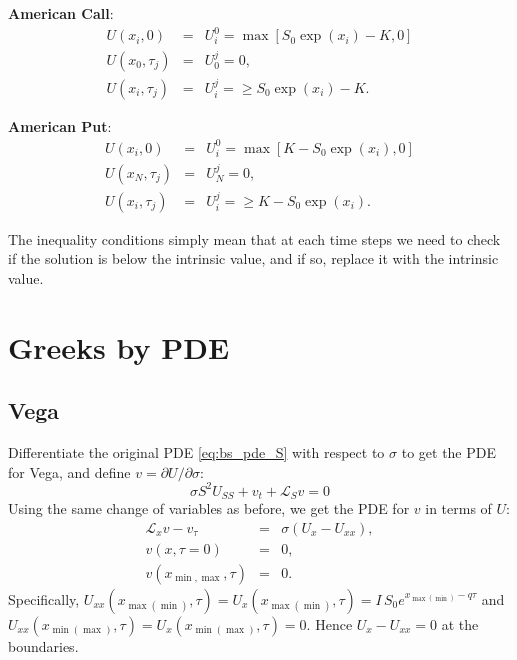 \documentclass[11pt, letterpaper]{article}
\begin{document}
        \textbf{American Call}:
        \begin{eqnarray}
            U(x_i, 0) &=& U_{i}^0 = \max \left[S_0 \exp(x_i) - K, 0\right]\nonumber\\
            U(x_0, \tau_j) & = & U_0^j= 0,\\
            U(x_i, \tau_j) & = & U_i^j = \ge S_0 \exp(x_i) - K.\nonumber
        \end{eqnarray}
        
        \textbf{American Put}:
        \begin{eqnarray}
            U(x_i, 0) &=& U_{i}^0 = \max \left[K - S_0 \exp(x_i), 0\right]\nonumber\\
            U(x_N, \tau_j) & = & U_{N}^j = 0,\\
            U(x_i, \tau_j) & = & U_i^j = \ge K - S_0 \exp(x_i).\nonumber
        \end{eqnarray}

        The inequality conditions simply mean that at each time steps we need to check if the solution is below
        the intrinsic value, and if so, replace it with the intrinsic value.

    \section{Greeks by PDE}

    \subsection{Vega}
    Differentiate the original PDE \eqref{eq:bs_pde_S} with respect to $\sigma$ to get the PDE for Vega, and define
    $v = \partial U / \partial \sigma$:
    \begin{equation}
        \sigma S^2 U_{SS} + v_t + \mathcal{L}_S v = 0
    \end{equation}
    Using the same change of variables as before, we get the PDE for $v$ in terms of $U$:
    \begin{eqnarray}
        \mathcal{L}_x v - v_\tau &=& \sigma (U_x - U_{xx}),\nonumber\\
        v(x, \tau = 0) &=& 0,\\
        v(x_{\min, \max}, \tau) &=& 0.
    \end{eqnarray}
    Specifically, $U_{xx} (x_{\max(\min)}, \tau) = U_x (x_{\max(\min)}, \tau) = I\, S_0 e^{x_{\max(\min)} -q \tau}$
    and $U_{xx}(x_{\min(\max)}, \tau) = U_x(x_{\min(\max)}, \tau) = 0$. Hence $U_x - U_{xx} = 0$ at the boundaries.
\end{document}
